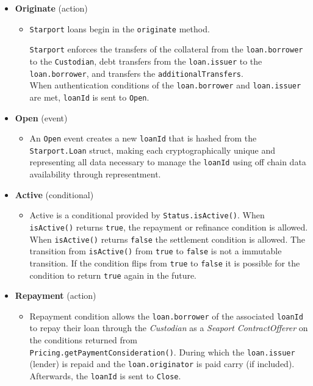 \documentclass[12pt]{article}
\begin{document}
\begin{itemize}
	\item \textbf{Originate} (action)
	\begin{itemize}
		\item \texttt{Starport} loans begin in the \texttt{originate} method. 

			\texttt{Starport} enforces the transfers of the collateral from the \texttt{loan.borrower} to the \texttt{Custodian}, debt transfers from the \texttt{loan.issuer} to the \texttt{loan.borrower}, and transfers the \texttt{additionalTransfers}.\\
			When authentication conditions of the \texttt{loan.borrower} and \texttt{loan.issuer} are met, \texttt{loanId} is sent to \texttt{Open}.
	\end{itemize}
	
	\item \textbf{Open} (event)
	\begin{itemize}
		\item An \texttt{Open} event creates a new \texttt{loanId} that is hashed from the \texttt{Starport.Loan} struct, making each cryptographically unique and representing all data necessary to manage the \texttt{loanId} using off chain data availability through representment.
	\end{itemize}
	
	\item \textbf{Active} (conditional)
	\begin{itemize}
		\item Active is a conditional provided by \texttt{Status.isActive()}. When \texttt{isActive()} returns \texttt{true}, the repayment or refinance condition is allowed. When \texttt{isActive()} returns \texttt{false} the settlement condition is allowed. The transition from \texttt{isActive()} from \texttt{true} to \texttt{false} is not a immutable transition. If the condition flips from \texttt{true} to \texttt{false} it is possible for the condition to return \texttt{true} again in the future.
	\end{itemize}
	
	\item \textbf{Repayment} (action)
	\begin{itemize}
		\item Repayment condition allows the \texttt{loan.borrower} of the associated \texttt{loanId} to repay their loan through the \emph{Custodian} as a \emph{Seaport} \emph{ContractOfferer} on the conditions returned from\\ \texttt{Pricing.getPaymentConsideration()}. During which the \texttt{loan.issuer} (lender) is repaid and the \texttt{loan.originator} is paid carry (if included). Afterwards, the \texttt{loanId} is sent to \texttt{Close}.
	\end{itemize}
	

\end{itemize}
\end{document}
